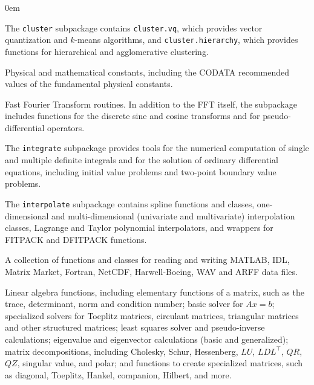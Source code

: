 \documentclass[fleqn,10pt]{wlscirep}
\begin{document}
\begin{description}[leftmargin=!, labelwidth=\widthof{\bfseries \texttt{interpolate}}]
\itemsep0em
\item[\texttt{cluster}]
    The \texttt{cluster} subpackage contains \texttt{cluster.vq}, which provides vector quantization and $k$-means algorithms, and \texttt{cluster.hierarchy}, which provides functions for hierarchical and
    agglomerative clustering.
\item[\texttt{constants}]
    Physical and mathematical constants, including the CODATA recommended
    values of the fundamental physical constants\cite{CODATA2014}.
\item[\texttt{fftpack}]
    Fast Fourier Transform routines.  In addition to the FFT itself, the subpackage
    includes functions for the discrete sine and cosine transforms and for
    pseudo-differential operators.
\item[\texttt{integrate}]
    The \texttt{integrate} subpackage provides tools for the numerical
    computation of single and multiple definite integrals and for the
    solution of ordinary differential equations, including initial value
    problems and two-point boundary value problems.
\item[\texttt{interpolate}]
    The \texttt{interpolate} subpackage contains spline functions and
    classes, one-dimensional and multi-dimensional (univariate and
    multivariate) interpolation classes, Lagrange and Taylor polynomial
    interpolators, and wrappers for FITPACK\cite{Dierckx:1993:CSF:151103} and DFITPACK functions.
\item[\texttt{io}]
    A collection of functions and classes for reading and writing MATLAB\cite{matlab}, IDL,
    Matrix Market\cite{boisvert1997matrix}, Fortran, NetCDF\cite{rew1990netcdf},
		Harwell-Boeing\cite{harwellboeing}, WAV and ARFF data files.
\item[\texttt{linalg}]
    Linear algebra functions, including
    elementary functions of a matrix, such as the trace, determinant, norm and
    condition number;
    basic solver for $Ax = b$;
    specialized solvers for Toeplitz matrices, circulant matrices, triangular
    matrices and other structured matrices; least squares solver and
    pseudo-inverse calculations; eigenvalue and eigenvector calculations
    (basic and generalized); matrix decompositions, including Cholesky, Schur,
    Hessenberg, $LU$, $LDL^{\intercal}$, $QR$, $QZ$, singular value, and polar;
    and functions to create specialized matrices, such as diagonal, Toeplitz,
    Hankel, companion, Hilbert, and more.

\end{description}
\end{document}
